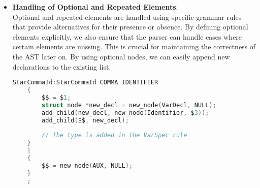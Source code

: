 \documentclass[12pt]{article}
\begin{document}
\begin{itemize}
    \item \textbf{Handling of Optional and Repeated Elements}: \\ Optional and repeated elements are handled using specific grammar rules that provide alternatives for their presence or absence.
    By defining optional elements explicitly, we also ensure that the parser can handle cases where certain elements are missing. This is crucial for maintaining the correctness of the AST later on.
    By using optional nodes, we can easily append new declarations to the existing list.
    \begin{center}
    \begin{lstlisting}[language=C, caption={StarCommaId Rule}, basicstyle=\small\ttfamily]
StarCommaId:StarCommaId COMMA IDENTIFIER
    {
        $$ = $1;
        struct node *new_decl = new_node(VarDecl, NULL);
        add_child(new_decl, new_node(Identifier, $3));
        add_child($$, new_decl);
        
        // The type is added in the VarSpec rule
    }
    |   
    {
        $$ = new_node(AUX, NULL);
    }
    ;
    \end{lstlisting}
    \end{center}


\end{itemize}
\end{document}
